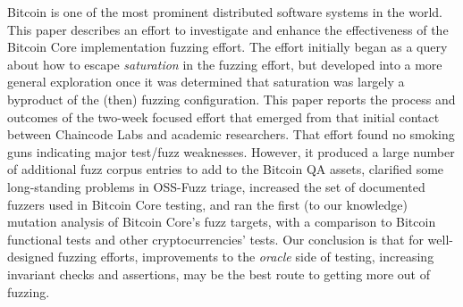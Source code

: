 Bitcoin is one of the most prominent distributed software systems in the world.  This paper describes an effort to investigate and enhance the effectiveness of the Bitcoin Core implementation fuzzing effort.  The effort initially began as a query about how to escape \emph{saturation} in the fuzzing effort, but developed into a more general exploration once it was determined that saturation was largely a byproduct of the (then) fuzzing configuration.  This paper reports the process and outcomes of the two-week focused effort that emerged from that initial contact between Chaincode Labs and academic researchers.  That effort found no smoking guns indicating major test/fuzz weaknesses. However, it produced a large number of additional fuzz corpus entries to add to the Bitcoin QA assets, clarified some long-standing problems in OSS-Fuzz triage, increased the set of documented fuzzers used in Bitcoin Core testing, and ran the first (to our knowledge) mutation analysis of Bitcoin Core's fuzz targets, with a comparison to Bitcoin functional tests and other cryptocurrencies' tests. Our conclusion is that for well-designed fuzzing efforts, improvements to the \emph{oracle} side of testing, increasing invariant checks and assertions, may be the best route to getting more out of fuzzing.
